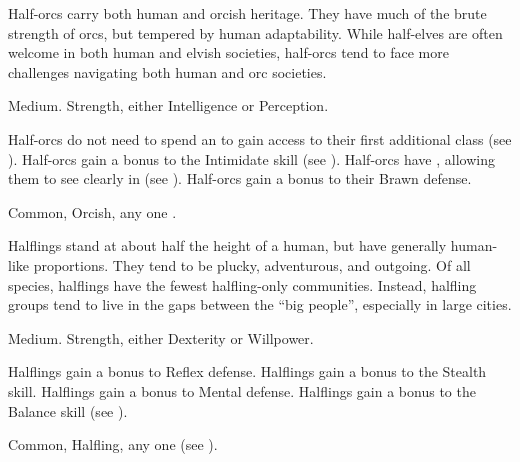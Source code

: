 
  Half-orcs carry both human and orcish heritage.
  They have much of the brute strength of orcs, but tempered by human adaptability.
  While half-elves are often welcome in both human and elvish societies, half-orcs tend to face more challenges navigating both human and orc societies.

   Medium.
    Strength, either  Intelligence or  Perception.
  \begin{raggeditemize}
     Half-orcs do not need to spend an  to gain access to their first additional class (see ).
     Half-orcs gain a  bonus to the Intimidate skill (see ).
     Half-orcs have , allowing them to see clearly in  (see ).
     Half-orcs gain a  bonus to their Brawn defense.
  \end{raggeditemize}
   Common, Orcish, any one .


  Halflings stand at about half the height of a human, but have generally human-like proportions.
  They tend to be plucky, adventurous, and outgoing.
  Of all species, halflings have the fewest halfling-only communities.
  Instead, halfling groups tend to live in the gaps between the ``big people'', especially in large cities.

   Medium.
    Strength, either  Dexterity or  Willpower.
  \begin{raggeditemize}
     Halflings gain a  bonus to Reflex defense.
     Halflings gain a  bonus to the Stealth skill.
     Halflings gain a  bonus to Mental defense.
     Halflings gain a  bonus to the Balance skill (see ).
  \end{raggeditemize}
   Common, Halfling, any one  (see ).

